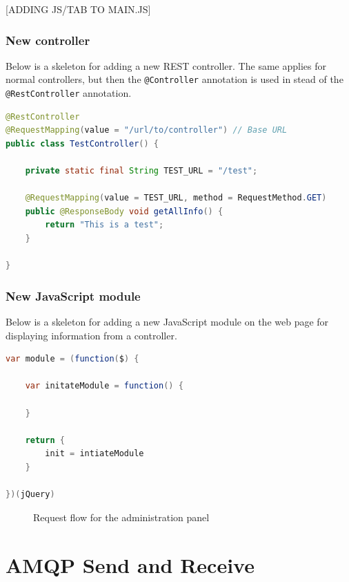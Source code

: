 [ADDING JS/TAB TO MAIN.JS]

\subsubsection{New controller}

Below is a skeleton for adding a new REST controller. The same applies for normal controllers, but then the \verb!@Controller! annotation is used in stead of the \verb!@RestController! annotation. 

\begin{lstlisting}[language=Java, captionpos=b, caption=Skeleton for a REST-controller, frame=bt]
@RestController
@RequestMapping(value = "/url/to/controller") // Base URL
public class TestController() {
    
    private static final String TEST_URL = "/test";
    
    @RequestMapping(value = TEST_URL, method = RequestMethod.GET)
    public @ResponseBody void getAllInfo() {
        return "This is a test";
    }
    
}
\end{lstlisting}

\subsubsection{New JavaScript module}

Below is a skeleton for adding a new JavaScript module on the web page for displaying information from a controller. 

\begin{lstlisting}[language=Java, captionpos=b, caption=Skeleton for a JavaScript module, frame=bt]
var module = (function($) { 

    var initateModule = function() {
    
    }

    return {
        init = intiateModule
    }

})(jQuery)


\end{lstlisting}

\begin{center}
  \begin{figure}[ht!]
    \caption{Request flow for the administration panel}
    \label{fig:oac-request-flow}
  \end{figure}
\end{center}

\section{AMQP Send and Receive}

\clearpage